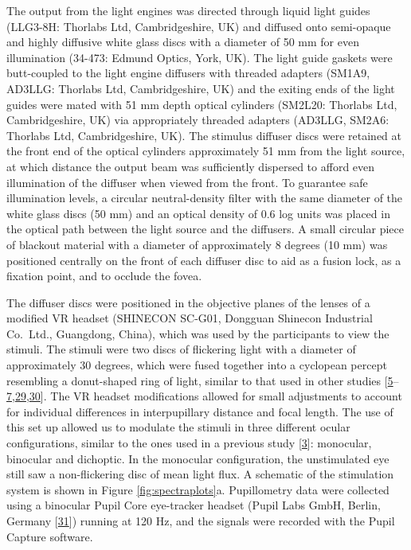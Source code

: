 \documentclass[
]{article}
\begin{document}
The output from the light engines was directed through liquid light guides (LLG3-8H: Thorlabs Ltd, Cambridgeshire, UK) and diffused onto semi-opaque and highly diffusive white glass discs with a diameter of 50 mm for even illumination (34-473: Edmund Optics, York, UK). The light guide gaskets were butt-coupled to the light engine diffusers with threaded adapters (SM1A9, AD3LLG: Thorlabs Ltd, Cambridgeshire, UK) and the exiting ends of the light guides were mated with 51 mm depth optical cylinders (SM2L20: Thorlabs Ltd, Cambridgeshire, UK) via appropriately threaded adapters (AD3LLG, SM2A6: Thorlabs Ltd, Cambridgeshire, UK). The stimulus diffuser discs were retained at the front end of the optical cylinders approximately 51 mm from the light source, at which distance the output beam was sufficiently dispersed to afford even illumination of the diffuser when viewed from the front. To guarantee safe illumination levels, a circular neutral-density filter with the same diameter of the white glass discs (50 mm) and an optical density of 0.6 log units was placed in the optical path between the light source and the diffusers. A small circular piece of blackout material with a diameter of approximately 8 degrees (10 mm) was positioned centrally on the front of each diffuser disc to aid as a fusion lock, as a fixation point, and to occlude the fovea.

The diffuser discs were positioned in the objective planes of the lenses of a modified VR headset (SHINECON SC-G01, Dongguan Shinecon Industrial Co.~Ltd., Guangdong, China), which was used by the participants to view the stimuli. The stimuli were two discs of flickering light with a diameter of approximately 30 degrees, which were fused together into a cyclopean percept resembling a donut-shaped ring of light, similar to that used in other studies {[}\protect\hyperlink{ref-Barrionuevo2016}{5}--\protect\hyperlink{ref-Spitschan2014}{7},\protect\hyperlink{ref-Spitschan2015}{29},\protect\hyperlink{ref-Zele2018}{30}{]}. The VR headset modifications allowed for small adjustments to account for individual differences in interpupillary distance and focal length. The use of this set up allowed us to modulate the stimuli in three different ocular configurations, similar to the ones used in a previous study {[}\protect\hyperlink{ref-Segala2023}{3}{]}: monocular, binocular and dichoptic. In the monocular configuration, the unstimulated eye still saw a non-flickering disc of mean light flux. A schematic of the stimulation system is shown in Figure \ref{fig:spectraplots}a. Pupillometry data were collected using a binocular Pupil Core eye-tracker headset (Pupil Labs GmbH, Berlin, Germany {[}\protect\hyperlink{ref-Kassner2014}{31}{]}) running at 120 Hz, and the signals were recorded with the Pupil Capture software.
\end{document}
